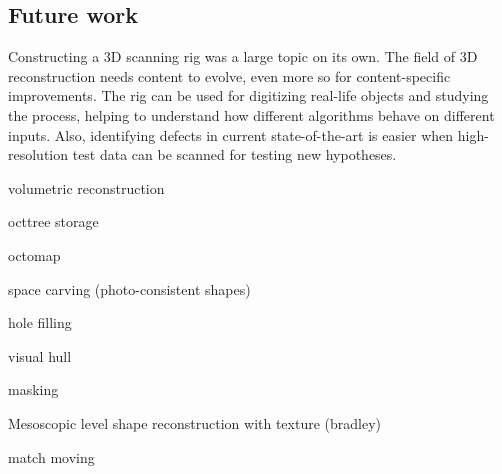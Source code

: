\subsection{Future work}


Constructing a 3D scanning rig was a large topic on its own.
The field of 3D reconstruction needs content to evolve, even more so for content-specific improvements.
The rig can be used for digitizing real-life objects and studying the process, helping to understand how different algorithms behave on different inputs.
Also, identifying defects in current state-of-the-art is easier when high-resolution test data can be scanned for testing new hypotheses.


volumetric reconstruction

octtree storage

octomap

space carving (photo-consistent shapes)

hole filling

visual hull

masking

Mesoscopic level shape reconstruction with texture (bradley)

match moving
